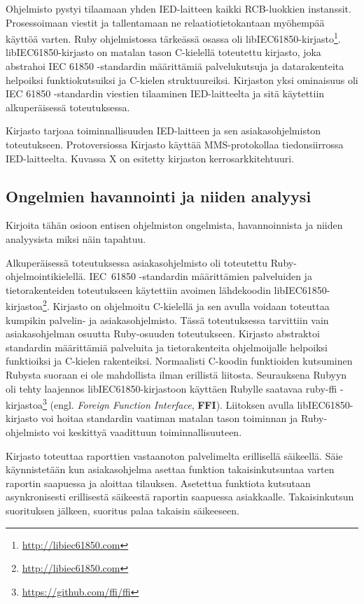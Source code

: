 Ohjelmisto pystyi tilaamaan yhden IED-laitteen kaikki RCB-luokkien instanssit. Prosessoimaan viestit ja tallentamaan ne relaatiotietokantaan myöhempää käyttöä varten. Ruby ohjelmistossa tärkeässä osassa oli libIEC61850-kirjasto\footnote{\url{http://libiec61850.com}}. libIEC61850-kirjasto on matalan tason C-kielellä toteutettu kirjasto, joka abstrahoi IEC 61850 -standardin määrittämiä palvelukutsuja ja datarakenteita helpoiksi funktiokutsuiksi ja C-kielen struktuureiksi. Kirjaston yksi ominaisuus oli IEC 61850 -standardin viestien tilaaminen IED-laitteelta ja sitä käytettiin alkuperäisessä toteutuksessa.

Kirjasto tarjoaa toiminnallisuuden IED-laitteen ja sen asiakasohjelmiston toteutukseen. Protoversiossa 
Kirjasto käyttää MMS-protokollaa tiedonsiirrossa IED-laitteelta. Kuvassa X on esitetty kirjaston kerrosarkkitehtuuri.



\subsection{Ongelmien havannointi ja niiden analyysi}
\begin{it}
	Kirjoita tähän osioon entisen ohjelmiston ongelmista, havannoinnista ja niiden analyysista miksi näin tapahtuu.
\end{it}

Alkuperäisessä toteutuksessa asiakasohjelmisto oli toteutettu Ruby-ohjelmointikielellä. IEC~61850 -standardin määrittämien palveluiden ja tietorakenteiden toteutukseen käytettiin avoimen lähdekoodin libIEC61850-kirjastoa\footnote{\url{http://libiec61850.com}}. Kirjasto on ohjelmoitu C-kielellä ja sen avulla voidaan toteuttaa kumpikin palvelin- ja asiakasohjelmisto. Tässä toteutuksessa tarvittiin vain asiakasohjelman osuutta Ruby-osuuden toteutukseen. Kirjasto abstraktoi standardin määrittämiä palveluita ja tietorakenteita ohjelmoijalle helpoiksi funktioiksi ja C-kielen rakenteiksi. Normaalisti C-koodin funktioiden kutsuminen Rubysta suoraan ei ole mahdollista ilman erillistä liitosta. Seurauksena Rubyyn oli tehty laajennos libIEC61850-kirjastoon käyttäen Rubylle saatavaa ruby-ffi -kirjastoa\footnote{\url{https://github.com/ffi/ffi}} (engl. \emph{Foreign Function Interface}, \textbf{FFI}). Liitoksen avulla libIEC61850-kirjasto voi hoitaa standardin vaatiman matalan tason toiminnan ja Ruby-ohjelmisto voi keskittyä vaadittuun toiminnallisuuteen.

Kirjasto toteuttaa raporttien vastaanoton palvelimelta erillisellä säikeellä. Säie käynnistetään kun asiakasohjelma asettaa funktion takaisinkutsuntaa varten raportin saapuessa ja aloittaa tilauksen. Asetettua funktiota kutsutaan asynkronisesti erillisestä säikeestä raportin saapuessa asiakkaalle. Takaisinkutsun suorituksen jälkeen, suoritus palaa takaisin säikeeseen.

